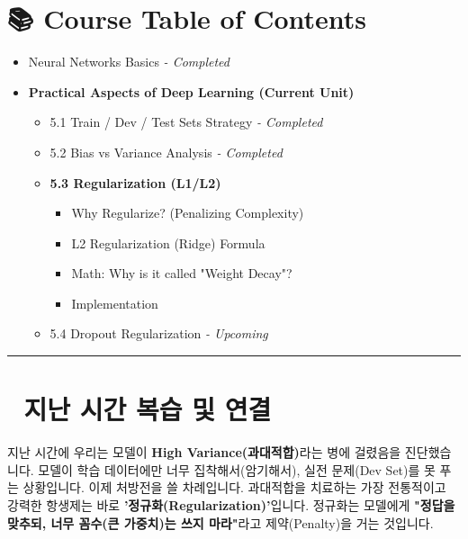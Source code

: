 \documentclass[11pt,a4paper]{book}
\theoremstyle{definition}
\begin{document}
\section*{📚 Course Table of Contents}
\begin{itemize}
    \item[Chapter 1-4.] Neural Networks Basics \textit{- Completed}
    \item[\textbf{Chapter 5.}] \textbf{Practical Aspects of Deep Learning (Current Unit)}
    \begin{itemize}
        \item 5.1 Train / Dev / Test Sets Strategy \textit{- Completed}
        \item 5.2 Bias vs Variance Analysis \textit{- Completed}
        \item \textbf{5.3 Regularization (L1/L2)}
        \begin{itemize}
            \item Why Regularize? (Penalizing Complexity)
            \item L2 Regularization (Ridge) Formula
            \item Math: Why is it called "Weight Decay"?
            \item Implementation
        \end{itemize}
        \item 5.4 Dropout Regularization \textit{- Upcoming}
    \end{itemize}
\end{itemize}

\vspace{0.5cm}
\hrule
\vspace{0.5cm}

\section*{🔗 지난 시간 복습 및 연결}
지난 시간에 우리는 모델이 \textbf{High Variance(과대적합)}라는 병에 걸렸음을 진단했습니다. 모델이 학습 데이터에만 너무 집착해서(암기해서), 실전 문제(Dev Set)를 못 푸는 상황입니다.
이제 처방전을 쓸 차례입니다. 과대적합을 치료하는 가장 전통적이고 강력한 항생제는 바로 \textbf{'정규화(Regularization)'}입니다. 정규화는 모델에게 \textbf{"정답을 맞추되, 너무 꼼수(큰 가중치)는 쓰지 마라"}라고 제약(Penalty)을 거는 것입니다.

\end{document}
